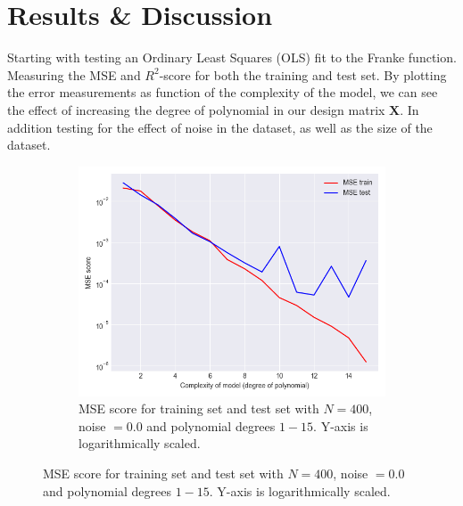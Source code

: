 \documentclass[a4paper,twocolumn]{article}
\newcommand{\X}{\mathbf{X}}
\begin{document}
\section{Results \& Discussion}
Starting with testing an Ordinary Least Squares (OLS) fit to the Franke function. Measuring the MSE and $R^{2}$-score for both the training and test set. By plotting the error measurements as function of the complexity of the model, we can see the effect of increasing the degree of polynomial in our design matrix $\X$. In addition testing for the effect of noise in the dataset, as well as the size of the dataset.
\begin{figure}[ht]
    \centering
    \begin{subfigure}[b]{0.9\columnwidth}
        \includegraphics[width=\columnwidth]{mse_vs_complexity_N=400_Noise=0.0_Degree=1-15.png}
        \caption{MSE score for training set and test set with $N = 400$, noise $= 0.0$ and polynomial degrees $1-15$. Y-axis is logarithmically scaled.}
    \end{subfigure}
    

\end{figure}
\end{document}
